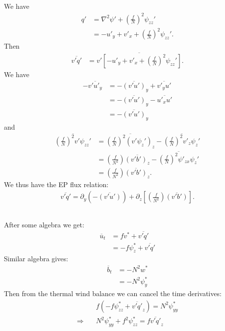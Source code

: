 \documentclass[11pt,letterpaper]{book}
\theoremstyle{definition}
\newcommand{\pe}{\partial}
\newcommand{\thus}{\Rightarrow \quad }
\begin{document}
\subsection{}
We have
\begin{align*}
q' &= \nabla^2\psi'+\left(\frac{f}{N}\right)^2\psi_{zz}'\\
&= -u'_y+v'_x+\left(\frac{f}{N}\right)^2\psi_{zz}'.
\end{align*}
Then
\begin{align*}
\overline{v'q'} &= \overline{v'\left[-u'_y+v'_x+\left(\frac{f}{N}\right)^2\psi_{zz}'\right]}.
\end{align*}
We have
\begin{align*}
-\overline{v'u'_y} &= -\overline{(v'u')}_y+\overline{v'_y u'}\\
&= -\overline{(v'u')}_y-\overline{u'_x u'}\\
&= -\overline{(v'u')}_y
\end{align*}
and
\begin{align*}
\overline{\left(\frac{f}{N}\right)^2v'\psi_{zz}'} &= \overline{\left(\frac{f}{N}\right)^2(v'\psi_{z}')_z}-\overline{\left(\frac{f}{N}\right)^2v'_z\psi_{z}'}\\
&= \left(\frac{f}{N^2}\right)\overline{(v'b')_z}
-\overline{\left(\frac{f}{N}\right)^2\psi'_{zx}\psi_{z}'}\\
&= \left(\frac{f}{N^2}\right)\overline{(v'b')}_z.
\end{align*}
We thus have the EP flux relation:
\begin{align*}
\overline{v'q'} = \pe_y(-\overline{(v'u')})+\pe_z\left[\left(\frac{f}{N^2}\right)\overline{(v'b')}\right].
\end{align*}

\subsection{}
After some algebra we get:
\begin{align*}
\overline{u}_t &= f{v}^*+\overline{v'q'}\\
&= -f{\psi}^*_z+\overline{v'q'}
\end{align*}
Similar algebra gives:
\begin{align*}
\overline{b}_t &= -N^2{w}^*\\
&= -N^2{\psi^*_y}
\end{align*}
Then from the thermal wind balance we can cancel the time derivatives:
\begin{align*}
&f(-f{\psi}^*_{zz}+\overline{v'q'}_z) = N^2{\psi^*_{yy}}\\
\thus &N^2{\psi^*_{yy}}+f^2{\psi}^*_{zz} = f\overline{v'q'}_z
\end{align*}
\end{document}
